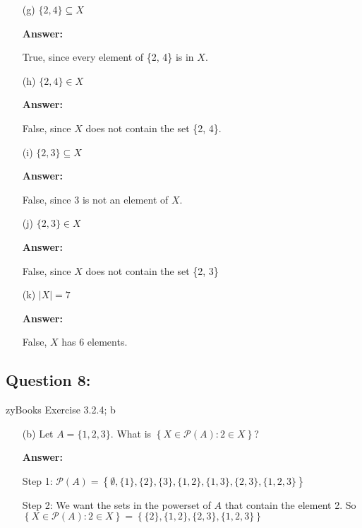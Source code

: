 \documentclass[14pt]{extreport}
\newcommand{\answer}[0]{\medskip \textbf{Answer:} \medskip}
\begin{document}
\begin{enumerate}
\begin{enumerate}
                \answer

                True, since every element of \{1, 2\} is in \( X \).

            \item[(g)] \( \{2, 4\} \subseteq X \)
            
                \answer

                True, since every element of \{2, 4\} is in \( X \).

            \item[(h)] \( \{2, 4\} \in X \)
            
                \answer

                False, since \( X \) does not contain the set \{2, 4\}.

            \item[(i)] \( \{2, 3\} \subseteq X \)
            
                \answer

                False, since 3 is not an element of \( X \).

            \item[(j)] \( \{2, 3\} \in X \)
            
                \answer

                False, since \( X \) does not contain the set \{2, 3\}

            \item[(k)] \( |X| = 7 \)
            
                \answer

                False, \( X \) has 6 elements.

        \end{enumerate}

\end{enumerate}
\newpage

\subsection*{Question 8:}

zyBooks Exercise 3.2.4; b

\begin{enumerate}
    \item [(b)] Let \( A = \{1, 2, 3\} \). What is \( \left\{ X \in \mathcal{P}(A): 2 \in X \right\} \)?
    
        \answer

        Step 1: \( \mathcal{P}(A) = \left\{ \emptyset, \{1\}, \{2\}, \{3\}, \{1, 2\}, \{1, 3\}, \{2, 3\}, \{1, 2, 3\} \right\} \)

        \medskip

        Step 2: We want the sets in the powerset of \( A \) that contain the element 2. So \( \left\{ X \in \mathcal{P}(A): 2 \in X \right\} = \left\{ \{2\}, \{1, 2\}, \{2, 3\}, \{1, 2, 3\} \right\} \)
\end{enumerate}
\newpage
\end{document}
